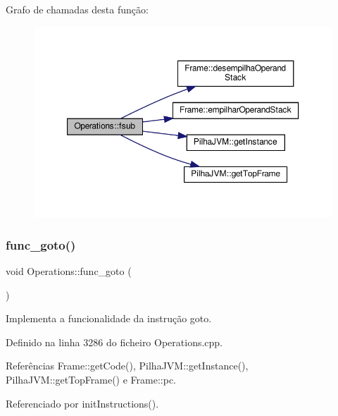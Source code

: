 Grafo de chamadas desta função\+:\nopagebreak
\begin{figure}[H]
\begin{center}
\leavevmode
\includegraphics[width=350pt]{classOperations_a138cd74b7244e430085eb4850de2b481_cgraph}
\end{center}
\end{figure}
\mbox{\label{classOperations_aa4ae9d3899f61ee20ec278152891fe9e}} 
\subsubsection{\texorpdfstring{func\+\_\+goto()}{func\_goto()}}
{\footnotesize\ttfamily void Operations\+::func\+\_\+goto (\begin{DoxyParamCaption}{ }\end{DoxyParamCaption})\hspace{0.3cm}{\ttfamily [private]}}



Implementa a funcionalidade da instrução goto. 



Definido na linha 3286 do ficheiro Operations.\+cpp.



Referências Frame\+::get\+Code(), Pilha\+J\+V\+M\+::get\+Instance(), Pilha\+J\+V\+M\+::get\+Top\+Frame() e Frame\+::pc.



Referenciado por init\+Instructions().

